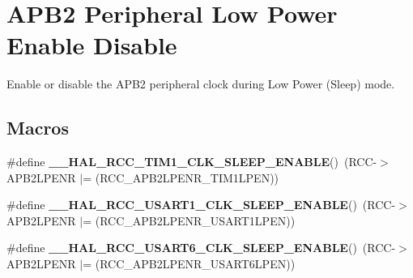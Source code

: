 \hypertarget{group___r_c_c___a_p_b2___low_power___enable___disable}{}\section{A\+P\+B2 Peripheral Low Power Enable Disable}
\label{group___r_c_c___a_p_b2___low_power___enable___disable}


Enable or disable the A\+P\+B2 peripheral clock during Low Power (Sleep) mode.  


\subsection*{Macros}
\begin{DoxyCompactItemize}
\item 
\mbox{\label{group___r_c_c___a_p_b2___low_power___enable___disable_ga6ce02f1b2689c664010bebc2363d1db4}} 
\#define {\bfseries \+\_\+\+\_\+\+H\+A\+L\+\_\+\+R\+C\+C\+\_\+\+T\+I\+M1\+\_\+\+C\+L\+K\+\_\+\+S\+L\+E\+E\+P\+\_\+\+E\+N\+A\+B\+LE}()~(R\+CC-\/$>$A\+P\+B2\+L\+P\+E\+NR $\vert$= (R\+C\+C\+\_\+\+A\+P\+B2\+L\+P\+E\+N\+R\+\_\+\+T\+I\+M1\+L\+P\+EN))
\item 
\mbox{\label{group___r_c_c___a_p_b2___low_power___enable___disable_ga454514918be60a95069da332eb212712}} 
\#define {\bfseries \+\_\+\+\_\+\+H\+A\+L\+\_\+\+R\+C\+C\+\_\+\+U\+S\+A\+R\+T1\+\_\+\+C\+L\+K\+\_\+\+S\+L\+E\+E\+P\+\_\+\+E\+N\+A\+B\+LE}()~(R\+CC-\/$>$A\+P\+B2\+L\+P\+E\+NR $\vert$= (R\+C\+C\+\_\+\+A\+P\+B2\+L\+P\+E\+N\+R\+\_\+\+U\+S\+A\+R\+T1\+L\+P\+EN))
\item 
\mbox{\label{group___r_c_c___a_p_b2___low_power___enable___disable_ga47fc15bdbf943a0b7164d888f1811184}} 
\#define {\bfseries \+\_\+\+\_\+\+H\+A\+L\+\_\+\+R\+C\+C\+\_\+\+U\+S\+A\+R\+T6\+\_\+\+C\+L\+K\+\_\+\+S\+L\+E\+E\+P\+\_\+\+E\+N\+A\+B\+LE}()~(R\+CC-\/$>$A\+P\+B2\+L\+P\+E\+NR $\vert$= (R\+C\+C\+\_\+\+A\+P\+B2\+L\+P\+E\+N\+R\+\_\+\+U\+S\+A\+R\+T6\+L\+P\+EN))
\item 
\mbox{\label{group___r_c_c___a_p_b2___low_power___enable___disable_ga37931819af9a7b1a05385e0ae6c984b6}} 

\end{DoxyCompactItemize}
